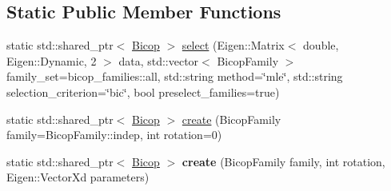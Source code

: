 \subsection*{Static Public Member Functions}
\begin{DoxyCompactItemize}
\item 
static std\+::shared\+\_\+ptr$<$ \hyperlink{classvinecopulib_1_1_bicop}{Bicop} $>$ \hyperlink{classvinecopulib_1_1_bicop_a24fe355af519622ee62efb83bf2f2085}{select} (Eigen\+::\+Matrix$<$ double, Eigen\+::\+Dynamic, 2 $>$ data, std\+::vector$<$ Bicop\+Family $>$ family\+\_\+set=bicop\+\_\+families\+::all, std\+::string method=\char`\"{}mle\char`\"{}, std\+::string selection\+\_\+criterion=\char`\"{}bic\char`\"{}, bool preselect\+\_\+families=true)
\end{DoxyCompactItemize}
{\bf }\par
\begin{DoxyCompactItemize}
\item 
static std\+::shared\+\_\+ptr$<$ \hyperlink{classvinecopulib_1_1_bicop}{Bicop} $>$ \hyperlink{classvinecopulib_1_1_bicop_a0b2045fa99e5d3aa76a3518426002b19}{create} (Bicop\+Family family=Bicop\+Family\+::indep, int rotation=0)
\item 
static std\+::shared\+\_\+ptr$<$ \hyperlink{classvinecopulib_1_1_bicop}{Bicop} $>$ {\bfseries create} (Bicop\+Family family, int rotation, Eigen\+::\+Vector\+Xd parameters)\hypertarget{classvinecopulib_1_1_bicop_a2e2d12a9063ada973caf1bdc0380e722}{}\label{classvinecopulib_1_1_bicop_a2e2d12a9063ada973caf1bdc0380e722}

\end{DoxyCompactItemize}

